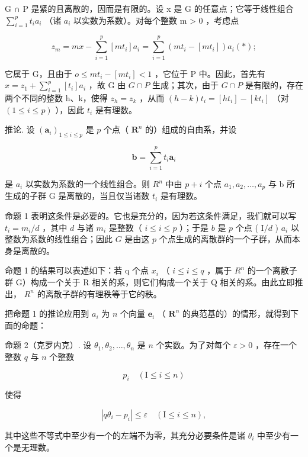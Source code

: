 G ∩ P 是紧的且离散的，因而是有限的。设 x 是 G 的任意点；它等于线性组合 \(\sum_{i=1}^{p} t_{i}a_{i}\) （诸 \(a_{i}\) 以实数为系数）。对每个整数 m \textgreater{} 0 ，考虑点

\[
z _ {m} = m x - \sum_ {i = 1} ^ {p} [ m t _ {i} ] a _ {i} = \sum_ {i = 1} ^ {p} (m t _ {i} - [ m t _ {i} ]) a _ {i} (*);
\]

它属于 G，且由于 \(o \leqslant mt_{i} - [mt_{i}] < 1\) ，它位于 P 中。因此，首先有 \(x = z_{1} + \sum_{i=1}^{p} [t_{i}] a_{i}\) ，故 G 由 \(G \cap P\) 生成；其次，由于 \(G \cap P\) 是有限的，存在两个不同的整数 h、k，使得 \(z_{h} = z_{k}\) ，从而 \((h - k)t_{i} = [ht_{i}] - [kt_{i}]\) （对 \((1 \leqslant i \leqslant p)\) ），因此 \(t_{i}\) 是有理数。

推论. 设 \((\pmb{a}_i)_{1\leqslant i\leqslant p}\) 是 \(p\) 个点（ \(\mathbf{R}^n\) 的）组成的自由系，并设

\[
\boldsymbol {b} = \sum_ {i = 1} ^ {p} t _ {i} \boldsymbol {a} _ {i}
\]

是 \(a_{i}\) 以实数为系数的一个线性组合。则 \(R^{n}\) 中由 \(p + i\) 个点 \(a_{1}, a_{2}, \ldots, a_{p}\) 与 b 所生成的子群 G 是离散的，当且仅当诸数 \(t_{i}\) 是有理数。

命题 1 表明这条件是必要的。它也是充分的，因为若这条件满足，我们就可以写 \(t_i = m_i / d\) ，其中 \(d\) 与诸 \(m_i\) 是整数（ \(i \leqslant i \leqslant p\) ）；于是 \(b\) 是 \(p\) 个点 ( \(\mathrm{I} / d\) ) \(a_i\) 以整数为系数的线性组合；因此 \(G\) 是由这 \(p\) 个点生成的离散群的一个子群，从而本身是离散的。

命题 1 的结果可以表述如下：若 q 个点 \(x_{i}\) （ \(i \leqslant i \leqslant q\) ，属于 \(R^{n}\) 的一个离散子群 G）构成一个关于 R 相关的系，则它们构成一个关于 Q 相关的系。由此立即推出， \(R^{n}\) 的离散子群的有理秩等于它的秩。

把命题 1 的推论应用到 \(a_{i}\) 为 \(n\) 个向量 \(\pmb{e}_{i}\) （ \(\mathbf{R}^{n}\) 的典范基的）的情形，就得到下面的命题：

命题 2（克罗内克）. 设 \(\theta_{1}, \theta_{2}, \ldots, \theta_{n}\) 是 \(n\) 个实数。为了对每个 \(\varepsilon > 0\) ，存在一个整数 \(q\) 与 \(n\) 个整数

\[
p _ {i} \quad (\mathrm{I} \leqslant i \leqslant n)
\]

使得

\[
\left| q \theta_ {i} - p _ {i} \right| \leqslant \varepsilon \quad (\mathrm{I} \leqslant i \leqslant n),
\]

其中这些不等式中至少有一个的左端不为零，其充分必要条件是诸 \(\theta_{i}\) 中至少有一个是无理数。

